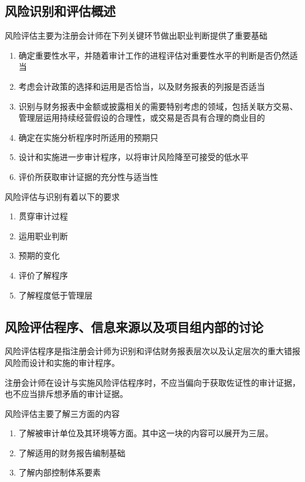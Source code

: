 \documentclass[UTF8,12pt]{ctexart}
\numberwithin{equation}{section} %
\numberwithin{figure}{section}
\numberwithin{table}{section}
\begin{document}
	\subsection{风险识别和评估概述}
	风险评估主要为注册会计师在下列关键环节做出职业判断提供了重要基础
	\begin{enumerate}
		\item 确定重要性水平，并随着审计工作的进程评估对重要性水平的判断是否仍然适当
		
		\item 考虑会计政策的选择和运用是否恰当，以及财务报表的列报是否适当
		
		\item 识别与财务报表中金额或披露相关的需要特别考虑的领域，包括关联方交易、管理层运用持续经营假设的合理性，或交易是否具有合理的商业目的
		
		\item 确定在实施分析程序时所适用的预期只
		
		\item 设计和实施进一步审计程序，以将审计风险降至可接受的低水平
		
		\item 评价所获取审计证据的充分性与适当性
	\end{enumerate}
	
	风险评估与识别有着以下的要求
	\begin{enumerate}
		\item 贯穿审计过程
		
		\item 运用职业判断
		
		\item 预期的变化
		
		\item 评价了解程序
		
		\item 了解程度低于管理层
	\end{enumerate}
	
	
	\subsection{风险评估程序、信息来源以及项目组内部的讨论}
	风险评估程序是指注册会计师为识别和评估财务报表层次以及认定层次的重大错报风险而设计和实施的审计程序。
	
	注册会计师在设计与实施风险评估程序时，不应当偏向于获取佐证性的审计证据，也不应当排斥想矛盾的审计证据。
	
	风险评估主要了解三方面的内容
	\begin{enumerate}
		\item 了解被审计单位及其环境等方面。其中这一块的内容可以展开为三层。
		
		\item 了解适用的财务报告编制基础
		
		\item 了解内部控制体系要素
	\end{enumerate}
	
\end{document}
